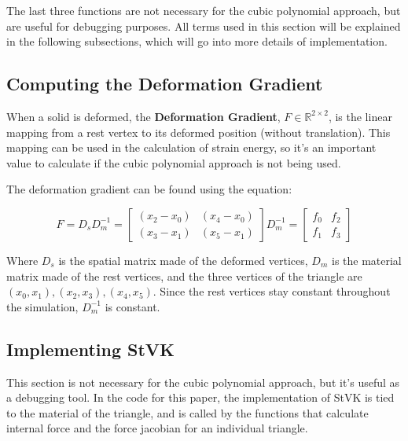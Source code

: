 \documentclass[twocolumn,10pt]{asme2ej}
\begin{document}
The last three functions are not necessary for the cubic polynomial approach, but are useful for debugging purposes.
All terms used in this section will be explained in the following subsections, which will go into more details of
implementation.

\subsection{Computing the Deformation Gradient}

When a solid is deformed, the \textbf{Deformation Gradient}, $F \in \mathbb{R}^{2 \times 2}$, is the linear mapping from a rest vertex to its deformed position (without translation). This mapping can be used in the calculation of strain energy, so it's an important value to calculate if the cubic polynomial approach is not being used.

The deformation gradient can be found using the equation:

\begin{equation}
F = D_sD_{m}^{-1} = \begin{bmatrix} (x_2 - x_0) & (x_4 - x_0) \\ (x_3 - x_1) & (x_5 - x_1) \end{bmatrix} D_{m}^{-1} = \begin{bmatrix} f_0 & f_2 \\ f_1 & f_3 \end{bmatrix}
\label{eq_F}
\end{equation}

Where $D_s$ is the spatial matrix made of the deformed vertices, $D_m$ is the material matrix made of the rest vertices, and the three vertices of the triangle are $(x_0, x_1), (x_2, x_3), (x_4, x_5)$. Since the rest vertices stay constant throughout the simulation, $D_{m}^{-1}$ is constant.

\subsection{Implementing StVK}

This section is not necessary for the cubic polynomial approach, but it's useful as a debugging tool. In the code
for this paper, the implementation of StVK is tied to the material of the triangle, and is called by the functions
that calculate internal force and the force jacobian for an individual triangle.
\end{document}

